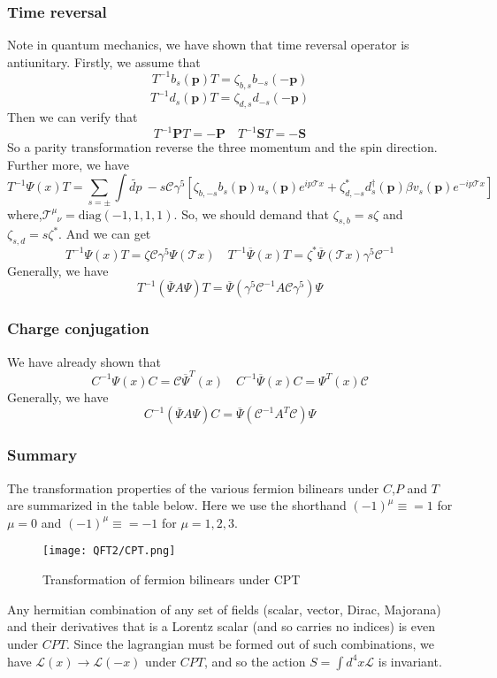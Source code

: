 \subsubsection{Time reversal}
Note in quantum mechanics, we have shown that time reversal operator is antiunitary. Firstly, we assume that
\[T^{-1} b_s(\bm{p}) T = \zeta_{b,s} b_{-s}(-\bm{p})\]
\[T^{-1} d_s(\bm{p}) T = \zeta_{d,s} d_{-s}(-\bm{p})\]
Then we can verify that
\[T^{-1} \bm{P} T = -\bm{P} \quad T^{-1} \bm{S} T = - \bm{S}\]
So a parity transformation reverse the three momentum and the spin direction. Further more, we have
\[T^{-1}\Psi(x)T = \sum_{s=\pm} \int \widetilde{dp} \: -s \mathcal{C} \gamma^5 \left [ \zeta_{b,-s} b_s(\bm{p}) u_s(\bm{p})e^{ip\mathcal{T}x} + \zeta_{d,-s}^* d^{\dagger}_s(\bm{p}) \beta v_s(\bm{p})e^{-ip\mathcal{T}x} \right ]\]
where,$\mathcal{T}^{\mu}_{\phantom{\mu}\nu} = \mathrm{diag}(-1,1,1,1)$. So, we should demand that $\zeta_{s,b} = s \zeta$ and $\zeta_{s,d} = s \zeta^*$. And we can get
\[T^{-1}\Psi(x)T = \zeta \mathcal{C} \gamma^5 \Psi(\mathcal{T}x) \quad T^{-1}\overline{\Psi}(x)T = \zeta^*  \overline{\Psi}(\mathcal{T}x)\gamma^5 \mathcal{C}^{-1} \]
Generally, we have
\[T^{-1} (\overline{\Psi} A \Psi) T = \overline{\Psi}(\gamma^5 \mathcal{C}^{-1} A \mathcal{C} \gamma^5)\Psi\]

\subsubsection{Charge conjugation}
\noindent
We have already shown that
\[C^{-1}\Psi(x)C = \mathcal{C} \overline{\Psi}^T(x) \quad C^{-1}\overline{\Psi}(x)C = \Psi^T(x)\mathcal{C}\]
Generally, we have
\[C^{-1}(\overline{\Psi} A \Psi )C = \overline{\Psi} (\mathcal{C}^{-1} A^T \mathcal{C})\Psi\]

\subsubsection{Summary}
The transformation properties of the various fermion bilinears under $C$,$P$ and $T$ are summarized in the table below. Here we use the shorthand $(-1)^{\mu} \equiv = 1$ for $\mu =0$ and $(-1)^{\mu} \equiv = -1$ for $\mu=1,2,3$.

\begin{figure}[!h]
\centering
\texttt{[image: QFT2/CPT.png]}
\caption{Transformation of fermion bilinears under CPT}
\end{figure}

\begin{newthem}
Any hermitian combination of any set of fields (scalar, vector, Dirac, Majorana) and their derivatives that is a Lorentz scalar (and so carries no indices) is even under $CPT$. Since the lagrangian must be formed out of such combinations, we
have $\mathcal{L}(x) \to \mathcal{L}(-x)$ under $CPT$, and so the action $S = \int d^4x \mathcal{L}$ is invariant.
\end{newthem}

